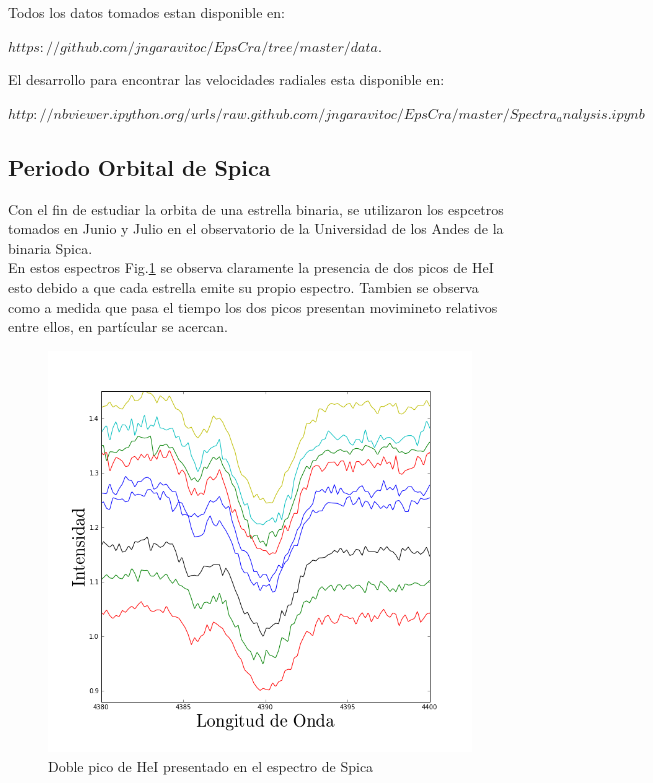 \documentclass[Proceedings]{ascelike}
\begin{document}
Todos los datos tomados estan disponible en:

$ https://github.com/jngaravitoc/EpsCra/tree/master/data.$

El desarrollo para encontrar las velocidades radiales esta 
disponible en:

$http://nbviewer.ipython.org/urls/raw.github.com/jngaravitoc/EpsCra/master/Spectra_analysis.ipynb
$
\subsection{Periodo Orbital de Spica}

Con el fin de estudiar la orbita de una estrella binaria, se utilizaron los espcetros tomados en Junio y Julio en el observatorio de la Universidad de los Andes de la binaria Spica.\\

En estos espectros Fig.\ref{dp} se observa claramente la presencia de dos picos de HeI esto debido a que cada estrella emite su propio espectro. Tambien se observa como a medida que pasa el tiempo los dos picos presentan movimineto relativos entre ellos, en part\'icular se acercan.\\

\begin{figure}
\includegraphics[scale=0.5]{doblepeak.png}
\caption{Doble pico de HeI presentado en el espectro de Spica \label{dp}}
\end{figure}
\end{document}
